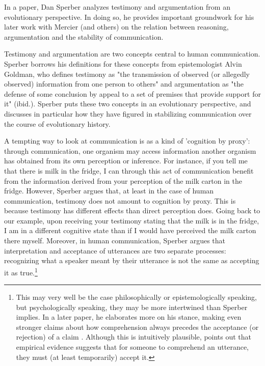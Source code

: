 In a \citeyear{Sperber01} paper, Dan Sperber analyzes testimony and argumentation from an evolutionary perspective. In doing so, he provides important groundwork for his later work with Mercier (and others) on the relation between reasoning, argumentation and the stability of communication.

Testimony and argumentation are two concepts central to human communication. Sperber borrows his definitions for these concepts from epistemologist Alvin Goldman, who defines testimony as "the transmission of observed (or allegedly observed) information from one person to others" \citep[p.~401]{Sperber01} and argumentation as "the defense of some conclusion by appeal to a set of premises that provide support for it" (ibid.).
Sperber puts these two concepts in an evolutionary perspective, and discusses in particular how they have figured in stabilizing communication over the course of evolutionary history.

A tempting way to look at communication is as a kind of 'cognition by proxy': through communication, one organism may access information another organism has obtained from its own perception or inference.
For instance, if you tell me that there is milk in the fridge, I can through this act of communication benefit from the information derived from your perception of the milk carton in the fridge.
However, Sperber argues that, at least in the case of human communication, testimony does not amount to cognition by proxy. This is because testimony has different effects than direct perception does. Going back to our example, upon receiving your testimony stating that the milk is in the fridge, I am in a different cognitive state than if I would have perceived the milk carton there myself. Moreover, in human communication, Sperber argues that interpretation and acceptance of utterances are two separate processes: recognizing what a speaker meant by their utterance is not the same as accepting it as true.\footnote{This may very well be the case philosophically or epistemologically speaking, but psychologically speaking, they may be more intertwined than Sperber implies. In a later paper, he elaborates more on his stance, making even stronger claims about how comprehension always precedes the acceptance (or rejection) of a claim \citep[\S 3]{Sperber10}. Although this is intuitively plausible, \citet{Lewandowsky12} points out that empirical evidence suggests that for someone to comprehend an utterance, they must (at least temporarily) accept it.}

